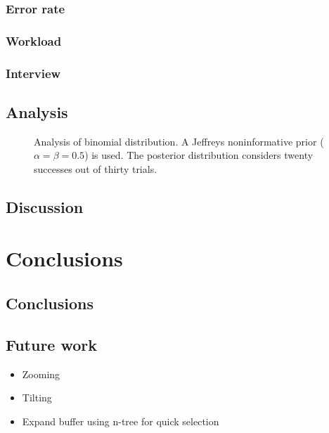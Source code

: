   \subsection{Error rate}
  \subsection{Workload}
  \subsection{Interview}
\section{Analysis}
\begin{figure}[h]
  \centering
  
  \caption{Analysis of binomial distribution. A Jeffreys noninformative prior ($\alpha = \beta = 0.5$) is used. The posterior distribution considers twenty successes out of thirty trials.}
  \label{fig:binom}
\end{figure}
\section{Discussion}

\chapter{Conclusions}
\label{ch:conclusion}
\section{Conclusions}
\section{Future work}
\begin{itemize}
  \item Zooming
  \item Tilting
  \item Expand buffer using n-tree for quick selection
\end{itemize}
